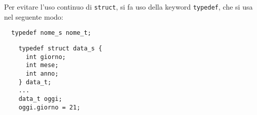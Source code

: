 Per evitare l'uso continuo di \verb|struct|, si fa uso della keyword \verb|typedef|, che si usa nel seguente modo:
\begin{verbatim}
  typedef nome_s nome_t;
\end{verbatim}

\begin{example}
  \begin{verbatim}
    typedef struct data_s {
      int giorno;
      int mese;
      int anno;
    } data_t;
    ...
    data_t oggi;
    oggi.giorno = 21;
  \end{verbatim}
\end{example}
